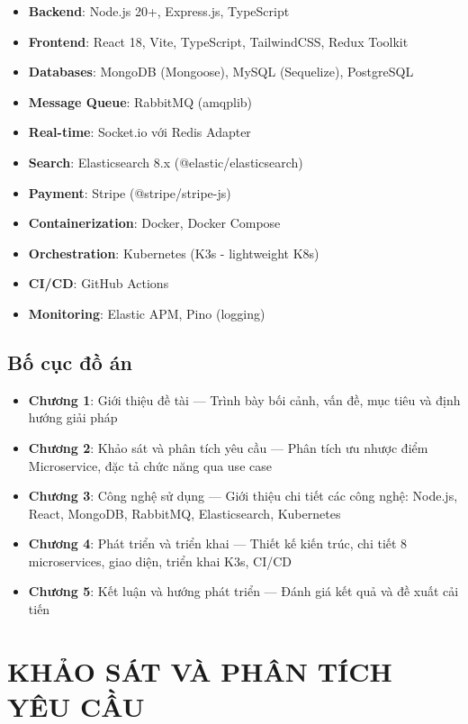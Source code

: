 \documentclass[12pt]{extreport}
\begin{document}
\begin{itemize}
    \item \textbf{Backend}: Node.js 20+, Express.js, TypeScript
    \item \textbf{Frontend}: React 18, Vite, TypeScript, TailwindCSS, Redux Toolkit
    \item \textbf{Databases}: MongoDB (Mongoose), MySQL (Sequelize), PostgreSQL
    \item \textbf{Message Queue}: RabbitMQ (amqplib)
    \item \textbf{Real-time}: Socket.io với Redis Adapter
    \item \textbf{Search}: Elasticsearch 8.x (@elastic/elasticsearch)
    \item \textbf{Payment}: Stripe (@stripe/stripe-js)
    \item \textbf{Containerization}: Docker, Docker Compose
    \item \textbf{Orchestration}: Kubernetes (K3s - lightweight K8s)
    \item \textbf{CI/CD}: GitHub Actions
    \item \textbf{Monitoring}: Elastic APM, Pino (logging)
\end{itemize}

\section{Bố cục đồ án}

\begin{itemize}
    \item \textbf{Chương 1}: Giới thiệu đề tài --- Trình bày bối cảnh, vấn đề, mục tiêu và định hướng giải pháp
    \item \textbf{Chương 2}: Khảo sát và phân tích yêu cầu --- Phân tích ưu nhược điểm Microservice, đặc tả chức năng qua use case
    \item \textbf{Chương 3}: Công nghệ sử dụng --- Giới thiệu chi tiết các công nghệ: Node.js, React, MongoDB, RabbitMQ, Elasticsearch, Kubernetes
    \item \textbf{Chương 4}: Phát triển và triển khai --- Thiết kế kiến trúc, chi tiết 8 microservices, giao diện, triển khai K3s, CI/CD
    \item \textbf{Chương 5}: Kết luận và hướng phát triển --- Đánh giá kết quả và đề xuất cải tiến
\end{itemize}

\chapter{KHẢO SÁT VÀ PHÂN TÍCH YÊU CẦU}
\end{document}
